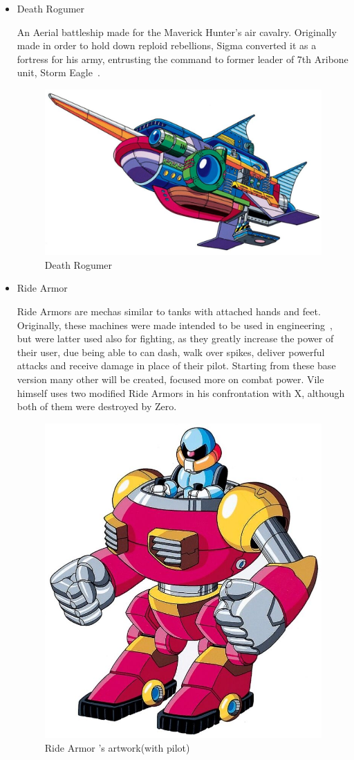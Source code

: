 \begin{itemize}
	\item \hypertarget{veichle:Death_Rogumer}{Death Rogumer}
	An Aerial battleship made for the Maverick Hunter's air cavalry. Originally made in order to hold down reploid rebellions, Sigma converted it as a fortress 
	for his army, entrusting the command to former leader of 7th Aribone unit, Storm Eagle~\cite{wayback:X_resources}.
	\begin{figure}[htp]
		\centering
		\includegraphics[width=\linewidth]{figures/X1/Storm_eagle/DeathRogumer.jpg}
		\caption{Death Rogumer}
	\end{figure}
	\item \hypertarget{veichle:Ride_Armor}{Ride Armor}
	Ride Armors are mechas similar to tanks with attached hands and feet. Originally, these machines were made intended to be used in engineering~\cite{wayback:X_resources}, but were latter used also for fighting, as they greatly increase the power of their user, due being able to can dash, walk over spikes, deliver powerful attacks and receive damage in place of 
	their pilot. Starting from these base version many other will be created, focused more on combat power. Vile himself uses two modified Ride Armors in his confrontation with X, although both of them were destroyed by Zero.
	\begin{figure}[htp]
		\centering
		\includegraphics[width=0.5\linewidth]{figures/X1/enemies/ArmorSoldier.jpg}
		\caption{Ride Armor 's artwork(with pilot)}
	\end{figure}
	
\end{itemize}